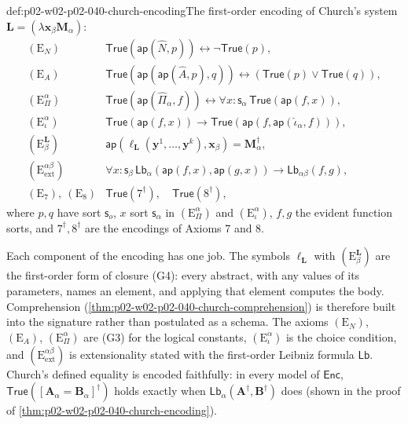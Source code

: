 \begin{hbdefinition}{def:p02-w02-p02-040-church-encoding}{The first-order encoding of Church's system}
\(\mathbf L=(\lambda\mathbf x_\beta\mathbf M_\alpha)\):
\[
\begin{array}{rl}
 (\mathrm E_N) & \mathsf{True}(\mathsf{ap}(\widehat N,p))\leftrightarrow\neg\mathsf{True}(p),\\
 (\mathrm E_A) & \mathsf{True}(\mathsf{ap}(\mathsf{ap}(\widehat A,p),q))\leftrightarrow(\mathsf{True}(p)\lor\mathsf{True}(q)),\\
 (\mathrm E_\Pi^\alpha) & \mathsf{True}(\mathsf{ap}(\widehat\Pi_\alpha,f))\leftrightarrow\forall x{:}\mathsf s_\alpha\,\mathsf{True}(\mathsf{ap}(f,x)),\\
 (\mathrm E_\iota^\alpha) & \mathsf{True}(\mathsf{ap}(f,x))\to\mathsf{True}(\mathsf{ap}(f,\mathsf{ap}(\widehat\iota_\alpha,f))),\\
 (\mathrm E_\beta^{\mathbf L}) & \mathsf{ap}(\ell_{\mathbf L}(\mathbf y^1,\ldots,\mathbf y^k),\mathbf x_\beta)=\mathbf M_\alpha^\dagger,\\
 (\mathrm E_{\mathrm{ext}}^{\alpha\beta}) & \forall x{:}\mathsf s_\beta\,\mathsf{Lb}_\alpha(\mathsf{ap}(f,x),\mathsf{ap}(g,x))\to\mathsf{Lb}_{\alpha\beta}(f,g),\\
 (\mathrm E_7),\ (\mathrm E_8) & \mathsf{True}(7^\dagger),\quad\mathsf{True}(8^\dagger),
\end{array}
\]
where \(p,q\) have sort \(\mathsf s_o\), \(x\) sort \(\mathsf s_\alpha\) in
\((\mathrm E_\Pi^\alpha)\) and \((\mathrm E_\iota^\alpha)\), \(f,g\) the evident
function sorts, and \(7^\dagger,8^\dagger\) are the encodings of Axioms 7 and
8.
\end{hbdefinition}

Each component of the encoding has one job.  The symbols \(\ell_{\mathbf L}\)
with \((\mathrm E_\beta^{\mathbf L})\) are the first-order form of closure
(G4): every abstract, with any values of its parameters, names an element,
and applying that element computes the body.  Comprehension
(\cref{thm:p02-w02-p02-040-church-comprehension}) is therefore built into
the signature rather than postulated as a schema.  The axioms
\((\mathrm E_N)\), \((\mathrm E_A)\), \((\mathrm E_\Pi^\alpha)\) are (G3) for the
logical constants, \((\mathrm E_\iota^\alpha)\) is the choice condition, and
\((\mathrm E_{\mathrm{ext}}^{\alpha\beta})\) is extensionality stated with the
first-order Leibniz formula \(\mathsf{Lb}\).  Church's defined equality is
encoded faithfully: in every model of \(\mathsf{Enc}\),
\(\mathsf{True}([\mathbf A_\alpha=\mathbf B_\alpha]^\dagger)\) holds exactly when
\(\mathsf{Lb}_\alpha(\mathbf A^\dagger,\mathbf B^\dagger)\) does (shown in the
proof of \cref{thm:p02-w02-p02-040-church-encoding}).

